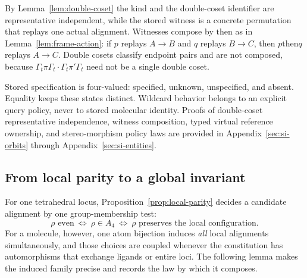 \documentclass[pdflatex,sn-mathphys-num,referee,lineno]{sn-jnl}
\theoremstyle{plain}
\theoremstyle{remark}
\theoremstyle{definition}
\begin{document}
By Lemma~\ref{lem:double-coset} the kind and the double-coset identifier are
representative independent, while the stored witness is a concrete permutation
that replays one actual alignment.  Witnesses compose by
\(\mathbin{\mathrm{then}}\) as in Lemma~\ref{lem:frame-action}: if \(p\) replays
\(A\to B\) and \(q\) replays \(B\to C\), then \(p\mathbin{\mathrm{then}}q\)
replays \(A\to C\).  Double cosets classify endpoint pairs and are not composed,
because \(\Gamma_t\pi\Gamma_t\cdot\Gamma_t\pi'\Gamma_t\) need not be a single
double coset.

Stored specification is four-valued: specified, unknown, unspecified, and
absent.  Equality keeps these states distinct.  Wildcard behavior belongs to
an explicit query policy, never to stored molecular identity.  Proofs of
double-coset representative independence, witness composition, typed virtual
reference ownership, and stereo-morphism policy laws are provided in
Appendix~\ref{sec:si-orbits} through Appendix~\ref{sec:si-entities}.


\subsection{From local parity to a global invariant}
\label{sec:local-to-global}

For one tetrahedral locus, Proposition~\ref{prop:local-parity} decides a
candidate alignment by one group-membership test:
\[
 \rho\text{ even}
 \ \Longleftrightarrow\
 \rho\in A_4
 \ \Longleftrightarrow\
 \rho\text{ preserves the local configuration}.
\]
For a molecule, however, one atom bijection induces \emph{all} local alignments
simultaneously, and those choices are coupled whenever the constitution has
automorphisms that exchange ligands or entire loci.  The following lemma makes
the induced family precise and records the law by which it composes.
\end{document}
